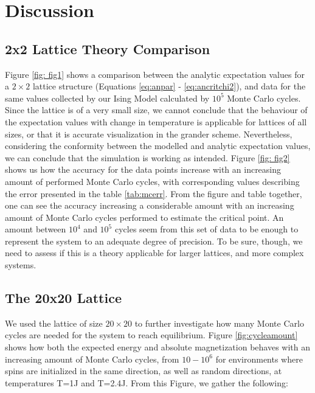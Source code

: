 \documentclass[10pt, nofootinbib, twocolumn]{revtex4-1}
\begin{document}
\cleardoublepage
\section{Discussion}\label{sec:discussion}
\subsection{2x2 Lattice Theory Comparison}
Figure \ref{fig: fig1} shows a comparison between the analytic expectation values for a $2\times 2$ lattice structure (Equations \eqref{eq:anpar} - \eqref{eq:ancritchi2}), and data for the same values collected by our Ising Model calculated by $10^5$ Monte Carlo cycles. Since the lattice is of a very small size, we cannot conclude that the behaviour of the expectation values with change in temperature is applicable for lattices of all sizes, or that it is accurate visualization in the grander scheme. Nevertheless, considering the conformity between the modelled and analytic expectation values, we can conclude that the simulation is working as intended. Figure \ref{fig: fig2} shows us how the accuracy for the data points increase with an increasing amount of performed Monte Carlo cycles, with corresponding values describing the error presented in the table \ref{tab:mcerr}. From the figure and table together, one can see the accuracy increasing a considerable amount with an increasing amount of Monte Carlo cycles performed to estimate the critical point. An amount between $10^4$ and $10^5$ cycles seem from this set of data to be enough to represent the system to an adequate degree of precision. To be sure, though, we need to assess if this is a theory applicable for larger lattices, and more complex systems. \\


\subsection{The 20x20 Lattice}
We used the lattice of size $20\times 20$ to further investigate how many Monte Carlo cycles are needed for the system to reach equilibrium. Figure \ref{fig:cycleamount} shows how both the expected energy and absolute magnetization behaves with an increasing amount of Monte Carlo cycles, from $10-10^6$ for environments where spins are initialized in the same direction, as well as random directions, at temperatures T=1J and T=2.4J. From this Figure, we gather the following: \\
\end{document}
